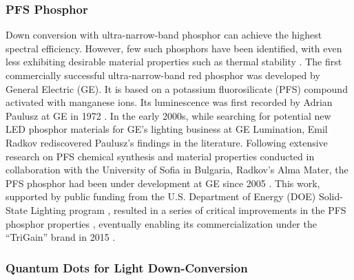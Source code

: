 \documentclass[10pt]{article}
\begin{document}
\subsubsection{PFS Phosphor}

Down conversion with ultra-narrow-band phosphor can achieve the highest spectral efficiency. However, few such phosphors have been identified, with even less exhibiting desirable material properties such as thermal stability \cite{Phillips2007}. The first commercially successful ultra-narrow-band red phosphor was developed by General Electric (GE). It is based on a potassium fluorosilicate (PFS) compound activated with manganese ions. Its luminescence was first recorded by Adrian Paulusz at GE in 1972 \cite{paulusz1973efficient}. In the early 2000s, while searching for potential new LED phosphor materials for GE’s lighting business at GE Lumination, Emil Radkov rediscovered Paulusz’s findings in the literature. Following extensive research on PFS chemical synthesis and material properties conducted in collaboration with the University of Sofia in Bulgaria, Radkov’s Alma Mater, the PFS phosphor had been under development at GE since 2005 \cite{radkov2006red}\cite{radkov2009red}. This work, supported by public funding from the U.S. Department of Energy (DOE) Solid-State Lighting program \cite{doesslprogram}, resulted in a series of critical improvements in the PFS phosphor properties \cite{Setlur2010}\cite{lyons2012color}, eventually enabling its commercialization under the “TriGain” brand in 2015 \cite{trigain_spectrum}\cite{setlur2015trigain}\cite{Murphy2015}.

\subsubsection{Quantum Dots for Light Down-Conversion}
\end{document}
